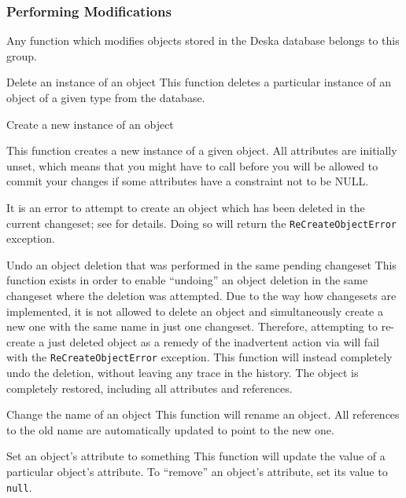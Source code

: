 \documentclass{article}
\begin{document}
\subsubsection{Performing Modifications}
\label{sec:api-group-data-modification}

Any function which modifies objects stored in the Deska database belongs to this group.

    {}
    {Delete an instance of an object}
    {This function deletes a particular instance of an object of a given type from the database.}

    {}
    {Create a new instance of an object}
    {This function creates a new instance of a given object.  All attributes are initially unset, which means that you
    might have to call  before you will be allowed to commit your changes if some attributes
    have a constraint not to be NULL.

    It is an error to attempt to create an object which has been deleted in the current changeset; see
     for details.  Doing so will return the {\tt ReCreateObjectError} exception.}

    {}
    {Undo an object deletion that was performed in the same pending changeset}
    {This function exists in order to enable ``undoing'' an object deletion in the same changeset where the deletion was
    attempted.  Due to the way how changesets are implemented, it is not allowed to delete an object and simultaneously
    create a new one with the same name in just one changeset.  Therefore, attempting to re-create a just deleted object
    as a remedy of the inadvertent action via  will fail with the {\tt ReCreateObjectError}
    exception.  This function will instead completely undo the deletion, without leaving any trace in the history.  The
    object is completely restored, including all attributes and references.}

    {}
    {Change the name of an object}
    {This function will rename an object.  All references to the old name are automatically updated to point to the new
    one.}

    {}
    {Set an object's attribute to something}
    {This function will update the value of a particular object's attribute.  To ``remove'' an object's attribute, set its
    value to {\tt null}.}
\end{document}
